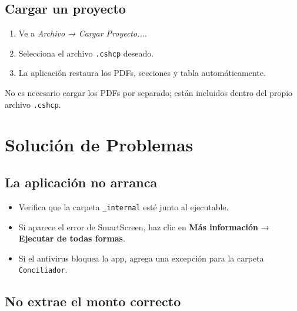 \documentclass[12pt, a4paper, oneside]{report}
\newcommand{\btn}[1]{\texttt{\colorbox{vino!15}{\strut#1}}}
\begin{document}

\section{Cargar un proyecto}

\begin{enumerate}
  \item Ve a \textit{Archivo → Cargar Proyecto...}.
  \item Selecciona el archivo \texttt{.cshcp} deseado.
  \item La aplicación restaura los PDFs, secciones y tabla automáticamente.
\end{enumerate}

\begin{notabox}
No es necesario cargar los PDFs por separado; están incluidos dentro del
propio archivo \texttt{.cshcp}.
\end{notabox}

\chapter{Solución de Problemas}

\section{La aplicación no arranca}

\begin{itemize}
  \item Verifica que la carpeta \texttt{\_internal} esté junto al ejecutable.
  \item Si aparece el error de SmartScreen, haz clic en \textbf{Más información}
        → \textbf{Ejecutar de todas formas}.
  \item Si el antivirus bloquea la app, agrega una excepción para la carpeta
        \texttt{Conciliador}.
\end{itemize}

\section{No extrae el monto correcto}
\end{document}
